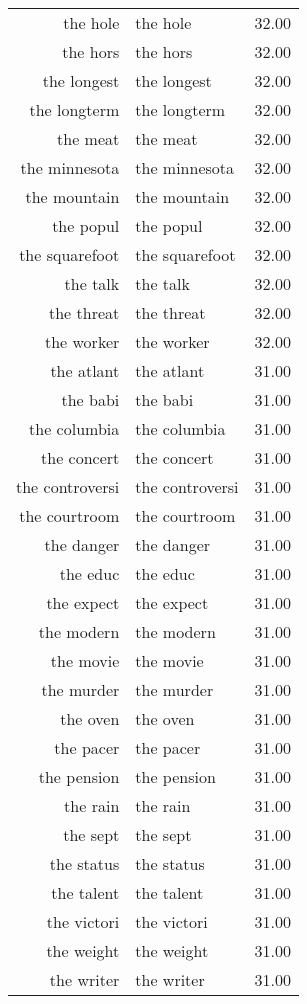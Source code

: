 \begin{table}[ht]
\begin{tabular}{rlr}
  the hole & the hole & 32.00 \\ 
  the hors & the hors & 32.00 \\ 
  the longest & the longest & 32.00 \\ 
  the longterm & the longterm & 32.00 \\ 
  the meat & the meat & 32.00 \\ 
  the minnesota & the minnesota & 32.00 \\ 
  the mountain & the mountain & 32.00 \\ 
  the popul & the popul & 32.00 \\ 
  the squarefoot & the squarefoot & 32.00 \\ 
  the talk & the talk & 32.00 \\ 
  the threat & the threat & 32.00 \\ 
  the worker & the worker & 32.00 \\ 
  the atlant & the atlant & 31.00 \\ 
  the babi & the babi & 31.00 \\ 
  the columbia & the columbia & 31.00 \\ 
  the concert & the concert & 31.00 \\ 
  the controversi & the controversi & 31.00 \\ 
  the courtroom & the courtroom & 31.00 \\ 
  the danger & the danger & 31.00 \\ 
  the educ & the educ & 31.00 \\ 
  the expect & the expect & 31.00 \\ 
  the modern & the modern & 31.00 \\ 
  the movie & the movie & 31.00 \\ 
  the murder & the murder & 31.00 \\ 
  the oven & the oven & 31.00 \\ 
  the pacer & the pacer & 31.00 \\ 
  the pension & the pension & 31.00 \\ 
  the rain & the rain & 31.00 \\ 
  the sept & the sept & 31.00 \\ 
  the status & the status & 31.00 \\ 
  the talent & the talent & 31.00 \\ 
  the victori & the victori & 31.00 \\ 
  the weight & the weight & 31.00 \\ 
  the writer & the writer & 31.00 \\ 

\end{tabular}
\end{table}
